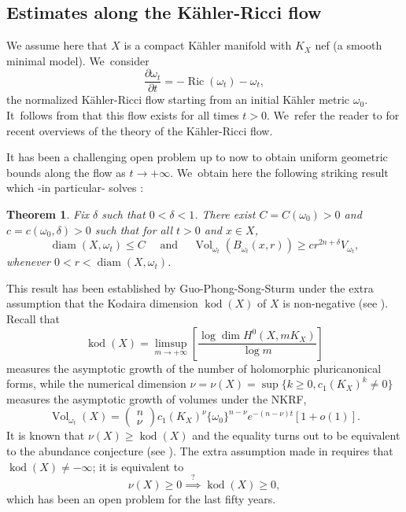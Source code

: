 \documentclass[11pt]{article}
\numberwithin{equation}{section}
\DeclareMathOperator{\diam}{diam}
\DeclareMathOperator{\kod}{kod}
\DeclareMathOperator{\Ric}{Ric}
\DeclareMathOperator{\Vol}{Vol}
\newtheorem{theorem}{Theorem}[section]
\theoremstyle{definition}
\begin{document}
\subsection{Estimates along the Kähler-Ricci flow} \label{sec:krf}

We assume here that $X$ is a compact Kähler manifold with $K_X$ nef (a smooth minimal model). We~consider
\[
\frac{\partial \omega_t}{\partial t}=-\Ric(\omega_t)-\omega_t,
\]
the normalized Kähler-Ricci flow starting from an initial Kähler metric $\omega_0$. It~follows from \cite{TZ06} that this flow exists for all times $t>0$. We~refer the reader to \cite{Tos18,Tos24} for recent overviews of the theory of the Kähler-Ricci flow.

It has been
a challenging open problem up to now to obtain uniform geometric bounds along the flow as $t \rightarrow +\infty$. We~obtain here the following striking result which -in particular- solves \cite[Conj.\,6.2]{Tos18}:

\begin{theorem} \label{thm:fkr}
Fix $\delta$ such that $0<\delta<1$.
There exist $C=C(\omega_0)>0$ and $c=c(\omega_0,\delta)>0$ such that for all $t>0$ and $x \in X$,
\[
\diam(X,\omega_t) \leq C
\quad \text{ and } \quad
\Vol_{\omega_t}(B_{\omega_t}(x,r)) \geq c r^{2n+\delta} V_{\omega_t},
\]
whenever $0<r<\diam(X,\omega_t)$.
\end{theorem}

This result has been established by Guo-Phong-Song-Sturm under the extra assumption that
the Kodaira dimension $\kod(X)$ of $X$ is non-negative (see \cite[Th.\,2.3]{GPSS22}).
Recall that
\[
\kod(X)=\limsup_{m \rightarrow+\infty} \left[ \frac{\log \dim H^0(X,mK_X)}{\log m} \right]
\]
measures the asymptotic growth of the number of holomorphic pluricanonical forms,
while the numerical dimension
$\nu=\nu(X)=\sup \{ k \geq 0, c_1(K_X)^k \neq 0 \}$
measures the asymptotic growth of volumes under the NKRF,
\begin{equation} \label{eq:volfkrn}
\Vol_{\omega_t}(X)=
\begin{pmatrix} n \\ \nu \end{pmatrix}
c_1(K_X)^{\nu} \{\omega_0\}^{n-\nu} e^{-(n-\nu)t} [1+o(1)].
\end{equation}
It is known that $\nu(X) \geq \kod(X)$ and the equality turns out to be equivalent to the abundance conjecture
(see \cite[Conj.\,6.3]{Tos18}).
The extra assumption made in \cite[Th.\,2.3]{GPSS22} requires that $\kod(X) \neq -\infty$;
it is equivalent to
\[
\nu(X) \geq 0 \stackrel{?}{\implies} \kod(X) \geq 0,
\]
which has been an open problem for the last fifty years.
\end{document}
